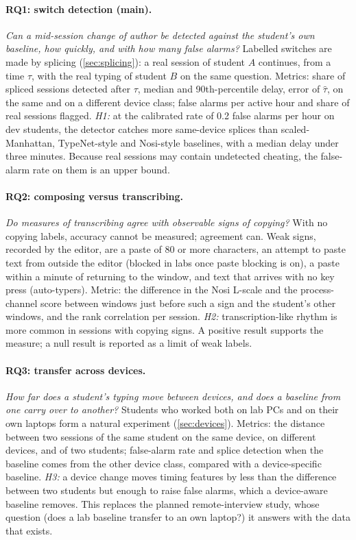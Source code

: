 \paragraph{RQ1: switch detection (main).} \emph{Can a mid-session change of author
be detected against the student's own baseline, how quickly, and with how many
false alarms?} Labelled switches are made by splicing (\cref{sec:splicing}): a real
session of student $A$ continues, from a time $\tau$, with the real typing of
student $B$ on the same question. Metrics: share of spliced sessions detected after
$\tau$, median and 90th-percentile delay, error of $\hat\tau$, on the same and on a
different device class; false alarms per active hour and share of real sessions
flagged. \emph{H1:} at the calibrated rate of 0.2 false alarms per hour on dev
students, the detector catches more same-device splices than scaled-Manhattan,
TypeNet-style and Nosi-style baselines, with a median delay under three minutes.
Because real sessions may contain undetected cheating, the false-alarm rate on them
is an upper bound.

\paragraph{RQ2: composing versus transcribing.} \emph{Do measures of transcribing
agree with observable signs of copying?} With no copying labels, accuracy cannot be
measured; agreement can. Weak signs, recorded by the editor, are a paste of 80 or
more characters, an attempt to paste text from outside the editor (blocked in labs
once paste blocking is on), a paste within a minute of returning to the window,
and text that arrives with no key press (auto-typers). Metric: the difference in the
Nosi L-scale and the process-channel score between windows just before such a sign
and the student's other windows, and the rank correlation per session. \emph{H2:}
transcription-like rhythm is more common in sessions with copying signs. A positive
result supports the measure; a null result is reported as a limit of weak labels.

\paragraph{RQ3: transfer across devices.} \emph{How far does a student's typing move
between devices, and does a baseline from one carry over to another?} Students who
worked both on lab PCs and on their own laptops form a natural experiment
(\cref{sec:devices}). Metrics: the distance between two sessions of the same student
on the same device, on different devices, and of two students; false-alarm rate and
splice detection when the baseline comes from the other device class, compared with
a device-specific baseline. \emph{H3:} a device change moves timing features by less
than the difference between two students but enough to raise false alarms, which a
device-aware baseline removes. This replaces the planned remote-interview study,
whose question (does a lab baseline transfer to an own laptop?) it answers with the
data that exists.

